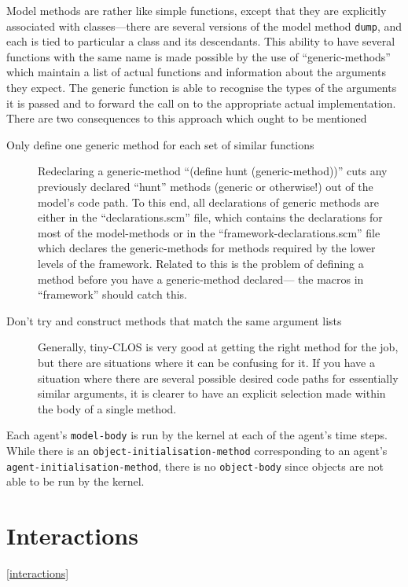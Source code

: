 Model methods are rather like simple functions, except that they are
explicitly associated with classes---there are several versions of
the model method \texttt{dump}, and each is tied to particular a class
and its descendants.  This ability to have several functions with the same
name is made possible by the use of ``generic-methods'' which
maintain a list of actual functions and information about the
arguments they expect.  The generic function is able to 
recognise the types of the arguments it is passed and to forward the
call on to the appropriate actual implementation.  There are two
consequences to this approach which ought to be mentioned
\begin{description}
  \item[Only define one generic method for each set of similar
    functions] Redeclaring a generic-method ``(define hunt
    (generic-method))'' cuts any previously declared ``hunt'' methods
    (generic or otherwise!) out of the model's code path. To this end,
    all declarations of generic methods are either in the
    ``declarations.scm'' file, which contains the declarations for
    most of the model-methods or in the ``framework-declarations.scm''
    file which declares the generic-methods for methods required by
    the lower levels of the framework.  Related to this is the problem
    of defining a method before you have a generic-method declared---
    the macros in ``framework'' should catch this.
  \item[Don't try and construct methods that match the same argument
    lists] Generally, tiny-CLOS is very good at getting the right
    method for the job, but there are situations where it can be
    confusing for it.  If you have a situation where there are several
    possible desired code paths for essentially similar arguments, it
    is clearer to have an explicit selection made within the body of a
    single method.
\end{description}
 
Each agent's \texttt{model-body} is run by the kernel at each of the
agent's time steps. While there is an
\texttt{object-initialisation-method} corresponding to an agent's
\texttt{agent-initialisation-method}, there is no \texttt{object-body}
since objects are not able to be run by the kernel.

\section{Interactions}\ref{interactions}

